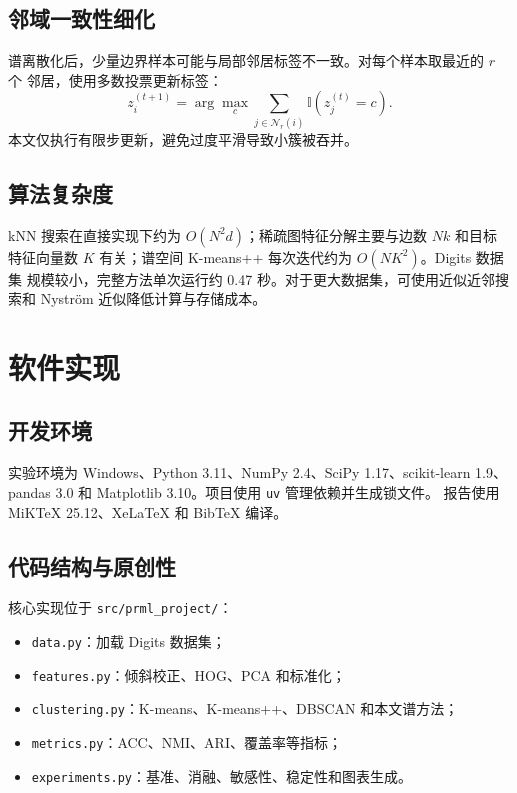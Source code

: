 \documentclass[12pt,a4paper,UTF8]{ctexart}
\begin{document}
\subsection{邻域一致性细化}

谱离散化后，少量边界样本可能与局部邻居标签不一致。对每个样本取最近的 $r$ 个
邻居，使用多数投票更新标签：
\begin{equation}
    z_i^{(t+1)}
    =\arg\max_c\sum_{j\in\mathcal{N}_r(i)}
    \mathbb{I}(z_j^{(t)}=c).
\end{equation}
本文仅执行有限步更新，避免过度平滑导致小簇被吞并。

\subsection{算法复杂度}

kNN 搜索在直接实现下约为 $O(N^2d)$；稀疏图特征分解主要与边数 $Nk$ 和目标
特征向量数 $K$ 有关；谱空间 K-means++ 每次迭代约为 $O(NK^2)$。Digits 数据集
规模较小，完整方法单次运行约 0.47 秒。对于更大数据集，可使用近似近邻搜索和
Nystr\"om 近似降低计算与存储成本。

\section{软件实现}

\subsection{开发环境}

实验环境为 Windows、Python 3.11、NumPy 2.4、SciPy 1.17、scikit-learn 1.9、
pandas 3.0 和 Matplotlib 3.10。项目使用 \texttt{uv} 管理依赖并生成锁文件。
报告使用 MiKTeX 25.12、XeLaTeX 和 BibTeX 编译。

\subsection{代码结构与原创性}

核心实现位于 \texttt{src/prml\_project/}：

\begin{itemize}
    \item \texttt{data.py}：加载 Digits 数据集；
    \item \texttt{features.py}：倾斜校正、HOG、PCA 和标准化；
    \item \texttt{clustering.py}：K-means、K-means++、DBSCAN 和本文谱方法；
    \item \texttt{metrics.py}：ACC、NMI、ARI、覆盖率等指标；
    \item \texttt{experiments.py}：基准、消融、敏感性、稳定性和图表生成。
\end{itemize}
\end{document}
